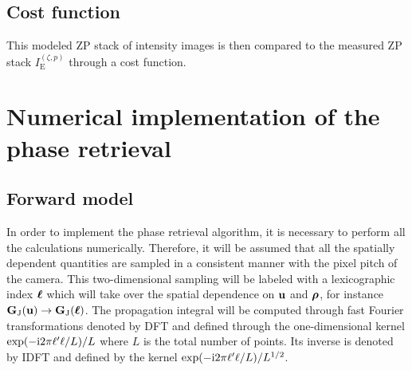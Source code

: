 \documentclass[reprint,aps,pra,superscriptaddress,
amsmath,amssymb]{revtex4-1}
\begin{document}
\subsection{Cost function}

This modeled ZP stack of intensity images is then compared to the measured 
ZP stack $I^{(\zeta ,p)}_\text{E}$ through a cost function. 


\section{Numerical implementation of the phase retrieval}

\subsection{Forward model}

In order to implement the phase retrieval algorithm, it is necessary to 
perform all the calculations numerically. Therefore, it will be assumed 
that all the spatially dependent quantities are sampled in a consistent 
manner with the pixel pitch of the camera. This two-dimensional sampling 
will be labeled with a  lexicographic index $\boldsymbol \ell $ which will take 
over the spatial dependence on $\textbf u$ and $\boldsymbol \rho$, for instance 
$ \textbf G_\text{J} (\textbf u) \rightarrow  \textbf G_\text{J} (\boldsymbol \ell )$. 
The propagation integral will be computed through fast Fourier 
transformations denoted by DFT and defined through the one-dimensional 
kernel $\exp (-\text{i} 2 \pi \ell' \ell/L ) / L $ where $L$ is the total 
number of points. Its inverse is denoted by IDFT and defined by the 
kernel $\exp (-\text{i} 2 \pi \ell' \ell/L ) / L^{1/2}$.
\end{document}
